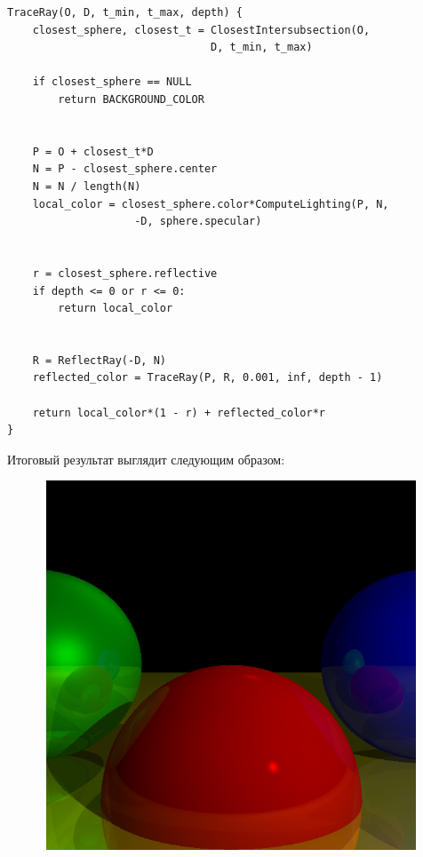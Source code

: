\begin{lstlisting}
TraceRay(O, D, t_min, t_max, depth) {
    closest_sphere, closest_t = ClosestIntersubsection(O, 
                                D, t_min, t_max)

    if closest_sphere == NULL
        return BACKGROUND_COLOR

    
    P = O + closest_t*D  
    N = P - closest_sphere.center  
    N = N / length(N)
    local_color = closest_sphere.color*ComputeLighting(P, N, 
                    -D, sphere.specular)

    
    r = closest_sphere.reflective
    if depth <= 0 or r <= 0:
        return local_color

    
    R = ReflectRay(-D, N)
    reflected_color = TraceRay(P, R, 0.001, inf, depth - 1)

    return local_color*(1 - r) + reflected_color*r
}
\end{lstlisting}

Итоговый результат выглядит следующим образом:

\includegraphics[width=13.8cm, height=11cm]{fourth_example.png}
